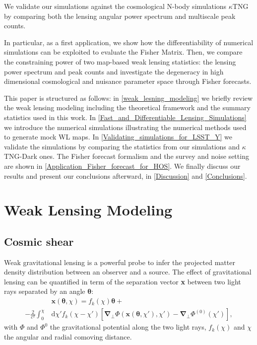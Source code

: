 \documentclass[twocolumn,twocolappendix]{aastex63}
\begin{document}
We validate our simulations against the cosmological N-body simulations $\kappa$TNG \citep{osato2021kappatng} by comparing both the lensing angular power spectrum and multiscale peak counts.

In particular, as a first application, we show how the differentiability of numerical simulations can be exploited to evaluate the Fisher Matrix. Then, we compare the constraining power of two map-based weak lensing statistics: the lensing power spectrum and peak counts and investigate the degeneracy in high dimensional cosmological and nuisance parameter space through Fisher forecasts. 

This paper is structured as follows: in \autoref{weak_lesning_modeling} we briefly review the weak lensing modeling including the theoretical framework and the summary statistics used in this work. In \autoref{Fast_and_Differentiable_Lensing_Simulations} we introduce the numerical simulations illustrating the numerical methods used to generate mock WL maps. In \autoref{Validating_simulations_for_LSST_Y} we validate the simulations by comparing the statistics from our simulations and $\kappa$TNG-Dark ones.
The Fisher forecast formalism and the survey and noise setting are shown in \autoref{Application_Fisher_forecast_for_HOS}. We finally discuss our results and present our conclusions afterward, in \autoref{Discussion} and \autoref{Conclusions}.


\section{Weak Lensing Modeling}\label{weak_lesning_modeling}
\subsection{{Cosmic shear}}
Weak gravitational lensing is a powerful probe to infer the projected matter density distribution between an observer and a source.
The effect of gravitational lensing 
can be quantified in term of the separation vector \textbf{x} between two light rays separated by an angle $\boldsymbol{\theta}$:
\begin{align}\label{sep}
   & \textbf{x}(\boldsymbol{\theta},\chi) =
    f_k(\chi)\boldsymbol{\theta} + \\
   - \frac{2}{c^2}
   \int_0^{\chi}
    &  \text{d}\chi'
    f_k(\chi-\chi')
    [ \boldsymbol{\nabla_{\bot}}\Phi( \textbf{x}(\boldsymbol{\theta},\chi'),\chi')-
    \boldsymbol{\nabla_{\bot}}\Phi^{(0)}(\chi')
    ],
\end{align}
with $\Phi$ and $\Phi^{0}$ the gravitational potential along the two light rays, $f_k(\chi)$ and $\chi$ the angular and radial comoving distance.
\end{document}
